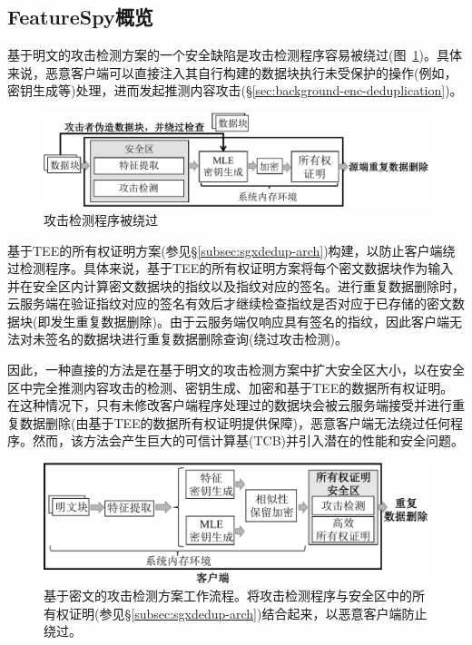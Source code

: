 \subsection{FeatureSpy概览}
\label{subsec:featurespy-secure_design}

基于明文的攻击检测方案的一个安全缺陷是攻击检测程序容易被绕过(图~\ref{fig:featurespy-architecture-strawman-bypass})。具体来说，恶意客户端可以直接注入其自行构建的数据块执行未受保护的操作(例如，密钥生成等)处理，进而发起推测内容攻击(\S\ref{sec:background-enc-deduplication})。

\begin{figure}[!htb]
    \centering
    \includegraphics[width=\textwidth]{pic/featurespy/naive-problem.pdf}
    \caption{攻击检测程序被绕过}
    \label{fig:featurespy-architecture-strawman-bypass}
\end{figure}


\sysnameF 基于TEE的所有权证明方案(参见\S\ref{subsec:sgxdedup-arch})构建，以防止客户端绕过检测程序。具体来说，基于TEE的所有权证明方案将每个密文数据块作为输入并在安全区内计算密文数据块的指纹以及指纹对应的签名。进行重复数据删除时，云服务端在验证指纹对应的签名有效后才继续检查指纹是否对应于已存储的密文数据块(即发生重复数据删除)。由于云服务端仅响应具有签名的指纹，因此客户端无法对未签名的数据块进行重复数据删除查询(绕过攻击检测)。

因此，一种直接的方法是在基于明文的攻击检测方案中扩大安全区大小，以在安全区中完全推测内容攻击的检测、密钥生成、加密和基于TEE的数据所有权证明。在这种情况下，只有未修改客户端程序处理过的数据块会被云服务端接受并进行重复数据删除(由基于TEE的数据所有权证明提供保障)，恶意客户端无法绕过任何程序。然而，该方法会产生巨大的可信计算基(TCB)并引入潜在的性能\cite{arnautov2016SCONE, harnik2018SGX, dinhngoc2019Everything}和安全\cite{lie2005TCB}问题。

\begin{figure}[!htb]
    \centering
    \includegraphics[width=\textwidth]{pic/featurespy/architecture.pdf}
    \caption{基于密文的攻击检测方案工作流程。\sysnameF 将攻击检测程序与安全区中的所有权证明(参见\S\ref{subsec:sgxdedup-arch})结合起来，以恶意客户端防止绕过。}
    \label{fig:featurespy-architecture-secure}
\end{figure}

